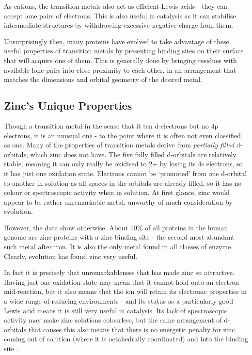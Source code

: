 As cations, the transition metals also act as efficient Lewis acids - they can accept lone pairs of electrons. This is also useful in catalysis as it can stabilise intermediate structures by withdrawing excessive negative charge from them.


Unsurprisingly then, many proteins have evolved to take advantage of these useful properties of transition metals by presenting binding sites on their surface that will acquire one of them. This is generally done by bringing residues with available lone pairs into close proximity to each other, in an arrangement that matches the dimensions and orbital geometry of the desired metal.

\subsection{Zinc's Unique Properties}

Though a transition metal in the sense that it ten d-electrons but no 4p electrons, it is an unusual one - to the point where it is often not even classified as one. Many of the properties of transition metals derive from \emph{partially filled} d-orbitals, which zinc does not have. The five fully filled d-orbitals are relatively stable, meaning it can only really be oxidised to 2+ by losing its 4s electrons, so it has just one oxidation state. Electrons cannot be `promoted' from one d-orbital to another in solution as all spaces in the orbitals are already filled, so it has no colour or spectroscopic activity when in solution. At first glance, zinc would appear to be rather unremarkable metal, unworthy of much consideration by evolution.

However, the data show otherwise. About 10\% of all proteins in the human genome are zinc proteins with a zinc binding site - the second most abundant such metal after iron. It is also the only metal found in all classes of enzyme. Clearly, evolution has found zinc very useful.

In fact it is precisely that unremarkableness that has made zinc so attractive. Having just one oxidation state may mean that it cannot hold onto an electron mid-reaction, but it also means that the ion will retain its electronic properties in a wide range of reducing environments - and its status as a particularly good Lewis acid means it is still very useful in catalysis. Its lack of spectroscopic activity may make zinc solutions colourless, but the same arrangement of d-orbitals that causes this also means that there is no energetic penalty for zinc coming out of solution (where it is octahedrally coordinated) and into the binding site .

